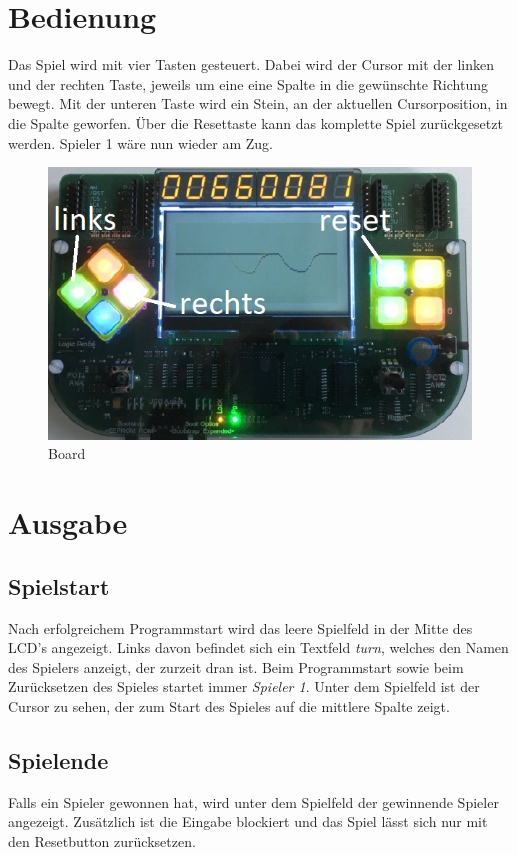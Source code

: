 \section{Bedienung}
    Das Spiel wird mit vier Tasten gesteuert.
    Dabei wird der Cursor mit der linken und der rechten Taste, jeweils um eine eine Spalte in die gewünschte Richtung bewegt.
    Mit der unteren Taste wird ein Stein, an der aktuellen Cursorposition, in die Spalte geworfen.
    Über die Resettaste kann das komplette Spiel zurückgesetzt werden. Spieler 1 wäre nun wieder am Zug.
    \begin{figure}[H]
        \centering
        \includegraphics[scale=0.5]{img/board.png}    
        \caption{Board}
        \label{fig:board}
    \end{figure}

\section{Ausgabe}
    \subsection{Spielstart}
        Nach erfolgreichem Programmstart wird das leere Spielfeld in der Mitte des LCD's angezeigt.
        Links davon befindet sich ein Textfeld \textit{turn}, welches den Namen des Spielers anzeigt, der zurzeit dran ist.
        Beim Programmstart sowie beim Zurücksetzen des Spieles startet immer \textit{Spieler 1}.
        Unter dem Spielfeld ist der Cursor zu sehen, der zum Start des Spieles auf die mittlere Spalte zeigt.
    \subsection{Spielende}
        Falls ein Spieler gewonnen hat, wird unter dem Spielfeld der gewinnende Spieler angezeigt.
        Zusätzlich ist die Eingabe blockiert und das Spiel lässt sich nur mit den Resetbutton zurücksetzen.




